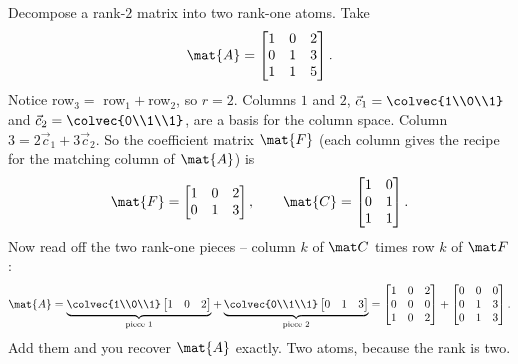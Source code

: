 \begin{example}\label{ch16:sum-numeric}
Decompose a rank-$2$ matrix into two rank-one atoms. Take
\[
  \mat{A} = \begin{bmatrix} 1 & 0 & 2 \\ 0 & 1 & 3 \\ 1 & 1 & 5 \end{bmatrix}.
\]
Notice row$_3 = $ row$_1 + $row$_2$, so $r=2$. Columns $1$ and $2$,
$\vec{c}_1=\colvec{1\\0\\1}$ and $\vec{c}_2=\colvec{0\\1\\1}$, are a basis for the
column space. Column $3 = 2\vec{c}_1 + 3\vec{c}_2$. So the coefficient matrix
$\mat{F}$ (each column gives the recipe for the matching column of $\mat{A}$) is
\[
  \mat{F} = \begin{bmatrix} 1 & 0 & 2 \\ 0 & 1 & 3 \end{bmatrix},
  \qquad
  \mat{C} = \begin{bmatrix} 1 & 0 \\ 0 & 1 \\ 1 & 1 \end{bmatrix}.
\]
Now read off the two rank-one pieces -- column $k$ of $\mat C$ times row $k$ of
$\mat F$:
\[
  \mat{A}
  = \underbrace{\colvec{1\\0\\1}\begin{bmatrix}1 & 0 & 2\end{bmatrix}}_{\text{piece }1}
  + \underbrace{\colvec{0\\1\\1}\begin{bmatrix}0 & 1 & 3\end{bmatrix}}_{\text{piece }2}
  = \begin{bmatrix} 1 & 0 & 2 \\ 0 & 0 & 0 \\ 1 & 0 & 2 \end{bmatrix}
  + \begin{bmatrix} 0 & 0 & 0 \\ 0 & 1 & 3 \\ 0 & 1 & 3 \end{bmatrix}.
\]
Add them and you recover $\mat{A}$ exactly. Two atoms, because the rank is two.
\end{example}

